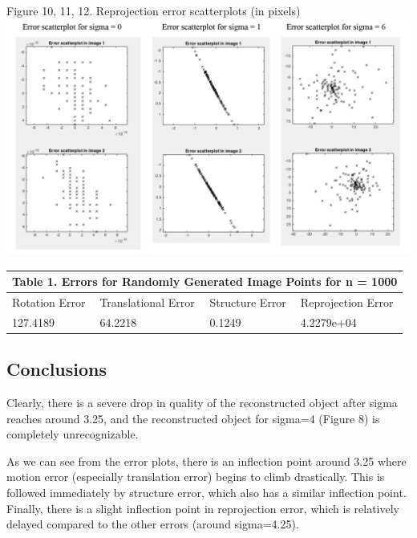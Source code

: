 \documentclass{article}
\begin{document}
\begin{center}
	Figure 10, 11, 12. Reprojection error scatterplots (in pixels)
	\includegraphics[width=\textwidth, keepaspectratio]{error_scatterplots.png}
\end{center}

\begin{tabular}{ |p{3cm}|p{3cm}|p{3cm}|p{3cm}|  }
 \hline
 \multicolumn{4}{|c|}{Table 1. Errors for Randomly Generated Image Points for n = 1000} \\ \hline
 \hline
 Rotation Error & Translational Error & Structure Error & Reprojection Error\\
 \hline
 127.4189 & 64.2218 & 0.1249 & 4.2279e+04\\
 \hline
\end{tabular}



\subsection{Conclusions}

Clearly, there is a severe drop in quality of the reconstructed object after sigma reaches around 3.25, and the reconstructed object for sigma=4 (Figure 8) is completely unrecognizable.

As we can see from the error plots, there is an inflection point around 3.25 where motion error (especially translation error) begins to climb drastically. This is followed immediately by structure error, which also has a similar inflection point. Finally, there is a slight inflection point in reprojection error, which is relatively delayed compared to the other errors (around sigma=4.25).

\end{document}
